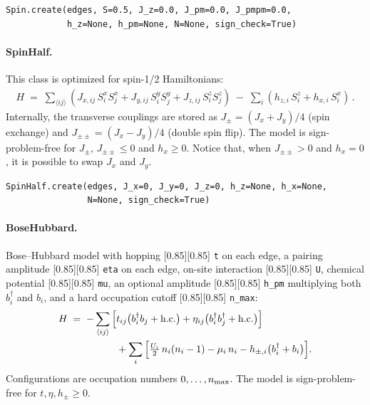 \documentclass{SciPost}
\newcommand{\pyinline}[1]{\begingroup\setlength{\fboxsep}{0pt}%
  \colorbox{gray!15}{\raisebox{0pt}[0.85\ht\strutbox][0.85\dp\strutbox]{%
    \hspace{1pt}\lstinline{#1}\hspace{1pt}}}\endgroup}
\begin{document}
\begin{lstlisting}
Spin.create(edges, S=0.5, J_z=0.0, J_pm=0.0, J_pmpm=0.0,
            h_z=None, h_pm=None, N=None, sign_check=True)
\end{lstlisting}

\paragraph{SpinHalf.}
This class is optimized for spin-1/2 Hamiltonians:
\begin{align}
	H \;=\; \sum_{\langle ij \rangle } \left(
		J_{x,ij}\, S^x_i S^x_j + J_{y,ij}\, S^y_i S^y_j + J_{z,ij}\, S^z_i S^z_j
	\right)
	\;-\; \sum_{i} \left( h_{z,i}\, S^z_i + h_{x,i}\, S^x_i \right)\,.
	\label{eq:H_spinhalf}
\end{align}
Internally, the transverse couplings are stored as $J_{\pm} = (J_x + J_y)/4$ (spin exchange) and $J_{\pm\pm} = (J_x - J_y)/4$ (double spin flip).
%
The model is sign-problem-free for $J_{\pm}, \, J_{\pm\pm} \leq 0$ and $h_x \geq 0$.
%
Notice that, when $J_{\pm\pm}>0$ and $h_x=0$, it is possible to swap $J_x$ and $J_y$.\\

\begin{lstlisting}
SpinHalf.create(edges, J_x=0, J_y=0, J_z=0, h_z=None, h_x=None,
                N=None, sign_check=True)
\end{lstlisting}

\paragraph{BoseHubbard.}
Bose--Hubbard model with hopping \pyinline{t} on each edge, a pairing amplitude \pyinline{eta} on each edge, on-site interaction \pyinline{U}, chemical potential \pyinline{mu}, an optional amplitude \pyinline{h_pm} multiplying both $b^\dagger_i$ and $b_i$, and a hard occupation cutoff \pyinline{n_max}:
\begin{align}
	H \;=\; -\sum_{\langle ij \rangle} \Big[ &t_{ij} \big( b^\dagger_i b_j + {\rm h.c.} \big)
		+ \eta_{ij} \big( b^\dagger_i b^\dagger_j + {\rm h.c.} \big) \Big] \notag \\
		&+ \sum_i \Big[ \tfrac{U_i}{2}\, n_i (n_i - 1) - \mu_i\, n_i
		- h_{\pm,i} \big( b^\dagger_i + b_i \big) \Big].
	\label{eq:H_bosehubbard_app}
\end{align}
Configurations are occupation numbers $0, \dots, n_{\rm max}$.
%
The model is sign-problem-free for $t, \eta, h_{\pm} \geq 0$.\\
\end{document}
